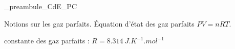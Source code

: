 



\ifdefined\mainIsLoaded\else
\RequirePackage{import}
{_preambule_CdE_PC}

\fi







\debutFicheEntrainement                                                                      %




\begin{prerequis}
	Notions sur les gaz parfaits.
	Équation d'état des gaz parfaits $PV=nRT$.
	
	\constantesUtiles
	\begin{listeConstantes}
		\item constante des gaz parfaits : $R=\SI{8,314}{J.K^{-1}.mol^{-1}}$
	\end{listeConstantes}	 
\end{prerequis}






